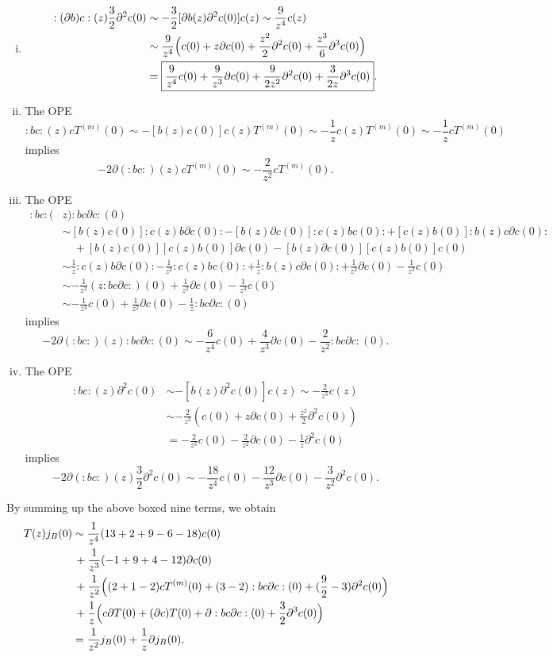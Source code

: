 \documentclass{../../../small}
\begin{document}
\begin{pf}[Solution of (2)]
\begin{enumerate}[(i)]
\item
\begin{align*}
:(\partial b)c:(z)\frac32\partial^2c(0)
&\sim-\frac32[\partial b(z)\partial^2 c(0)]c(z)
\sim\frac9{z^4}c(z)\\
&\sim\frac9{z^4}\Bigl(c(0)+z\partial c(0)+\frac{z^2}2\partial^2c(0)+\frac{z^3}6\partial^3c(0)\Bigr)\\
&=\boxed{\frac9{z^4}c(0)+\frac9{z^3}\partial c(0)+\frac9{2z^2}\partial^2c(0)+\frac3{2z}\partial^3c(0)}.
\end{align*}


\item
The OPE
\[:bc:(z)cT^{(m)}(0)
\sim-[b(z)c(0)]c(z)T^{(m)}(0)
\sim-\frac1zc(z)T^{(m)}(0)
\sim-\frac1zcT^{(m)}(0)\]
implies
\[-2\partial(:bc:)(z)cT^{(m)}(0)
\sim\boxed{-\frac2{z^2}cT^{(m)}(0)}.\]


\item
The OPE
\begin{align*}
:bc:(&z):bc\partial c:(0)\\
&\sim[b(z)c(0)]:c(z)b\partial c(0):
-[b(z)\partial c(0)]:c(z)bc(0):
+[c(z)b(0)]:b(z)c\partial c(0):\\
&\quad+[b(z)c(0)][c(z)b(0)]\partial c(0)-[b(z)\partial c(0)][c(z)b(0)]c(0)\\
&\sim\frac1z:c(z)b\partial c(0):
-\frac1{z^2}:c(z)bc(0):
+\frac1z:b(z)c\partial c(0):
+\frac1{z^2}\partial c(0)-\frac1{z^3}c(0)\\
&\sim-\frac1{z^2}(z:bc\partial c:)(0)+\frac1{z^2}\partial c(0)-\frac1{z^3}c(0)\\
&\sim-\frac1{z^3}c(0)+\frac1{z^2}\partial c(0)-\frac1z:bc\partial c:(0)
\end{align*}
implies
\[-2\partial(:bc:)(z):bc\partial c:(0)
\sim\boxed{-\frac6{z^4}c(0)+\frac4{z^3}\partial c(0)-\frac2{z^2}:bc\partial c:(0)}.\]

\item
The OPE
\begin{align*}
:bc:(z)\partial^2 c(0)
&\sim-[b(z)\partial^2c(0)]c(z)
\sim-\frac2{z^3}c(z)\\
&\sim-\frac2{z^3}(c(0)+z\partial c(0)+\frac{z^2}2\partial^2c(0))\\
&=-\frac2{z^3}c(0)-\frac2{z^2}\partial c(0)-\frac1z\partial^2c(0)
\end{align*}
implies
\[-2\partial(:bc:)(z)\frac32\partial^2c(0)
\sim\boxed{-\frac{18}{z^4}c(0)-\frac{12}{z^3}\partial c(0)-\frac3{z^2}\partial^2c(0)}.\]
\end{enumerate}
By summing up the above boxed nine terms, we obtain
\begin{align*}
T(z)j_B(0)
&\sim\frac1{z^4}(13+2+9-6-18)c(0)\\
&\,+\frac1{z^3}(-1+9+4-12)\partial c(0)\\
&\,+\frac1{z^2}\Bigl((2+1-2)cT^{(m)}(0)+(3-2):bc\partial c:(0)+(\frac92-3)\partial^2 c(0)\Bigr)\\
&\,+\frac1z\Bigl(c\partial T(0)+(\partial c)T(0)+\partial:bc\partial c:(0)+\frac32\partial^3c(0)\Bigr)\\
&=\frac1{z^2}j_B(0)+\frac1z\partial j_B(0).
\end{align*}
\end{pf}
\end{document}
